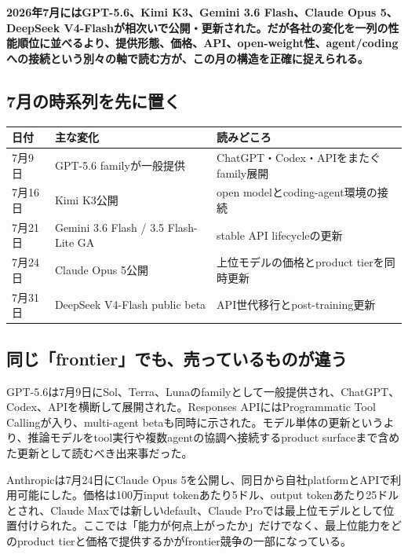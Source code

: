 \noindent\textbf{2026年7月にはGPT-5.6、Kimi K3、Gemini 3.6 Flash、Claude Opus 5、DeepSeek V4-Flashが相次いで公開・更新された。だが各社の変化を一列の性能順位に並べるより、提供形態、価格、API、open-weight性、agent/codingへの接続という別々の軸で読む方が、この月の構造を正確に捉えられる。}\autocite{src-9191d43918fc,src-a24fd97eb3d0,src-e19fbb75eb44,src-e547d0d8cbe3,src-f6aa679babd7}

\subsection{7月の時系列を先に置く}

\begin{center}
\small
\begin{tabularx}{\columnwidth}{>{\raggedright\arraybackslash}X|>{\raggedright\arraybackslash}X|>{\raggedright\arraybackslash}X}
\toprule
\textbf{日付} & \textbf{主な変化} & \textbf{読みどころ} \\
\midrule
7月9日 & GPT-5.6 familyが一般提供 & ChatGPT・Codex・APIをまたぐfamily展開 \\
7月16日 & Kimi K3公開 & open modelとcoding-agent環境の接続 \\
7月21日 & Gemini 3.6 Flash / 3.5 Flash-Lite GA & stable API lifecycleの更新 \\
7月24日 & Claude Opus 5公開 & 上位モデルの価格とproduct tierを同時更新 \\
7月31日 & DeepSeek V4-Flash public beta & API世代移行とpost-training更新 \\
\bottomrule
\end{tabularx}
\autocite{src-9191d43918fc,src-a24fd97eb3d0,src-e19fbb75eb44,src-e547d0d8cbe3,src-f6aa679babd7}
\end{center}

\subsection{同じ「frontier」でも、売っているものが違う}

GPT-5.6は7月9日にSol、Terra、Lunaのfamilyとして一般提供され、ChatGPT、Codex、APIを横断して展開された。Responses APIにはProgrammatic Tool Callingが入り、multi-agent betaも同時に示された。モデル単体の更新というより、推論モデルをtool実行や複数agentの協調へ接続するproduct surfaceまで含めた更新として読むべき出来事だった。\autocite{src-e19fbb75eb44}


Anthropicは7月24日にClaude Opus 5を公開し、同日から自社platformとAPIで利用可能にした。価格は100万input tokenあたり5ドル、output tokenあたり25ドルとされ、Claude Maxでは新しいdefault、Claude Proでは最上位モデルとして位置付けられた。ここでは「能力が何点上がったか」だけでなく、最上位能力をどのproduct tierと価格で提供するかがfrontier競争の一部になっている。\autocite{src-f6aa679babd7}


